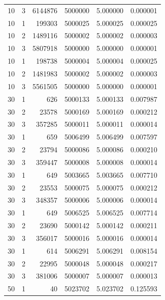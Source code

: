 \documentclass[a4paper,oneside]{book}
\begin{document}
\begin{longtable}[c]{|l|l|r|l|l|l|}
    10       & 3         & 6144876   & 5000000 & 5.000000   & 0.000001 \\
    10       & 1         & 199303    & 5000025 & 5.000025   & 0.000025 \\
    10       & 2         & 1489116   & 5000002 & 5.000002   & 0.000003 \\
    10       & 3         & 5807918   & 5000000 & 5.000000   & 0.000001 \\
    10       & 1         & 198738    & 5000004 & 5.000004   & 0.000025 \\
    10       & 2         & 1481983   & 5000002 & 5.000002   & 0.000003 \\
    10       & 3         & 5561505   & 5000000 & 5.000000   & 0.000001 \\
    30       & 1         & 626       & 5000133 & 5.000133   & 0.007987 \\
    30       & 2         & 23578     & 5000169 & 5.000169   & 0.000212 \\
    30       & 3         & 357285    & 5000011 & 5.000011   & 0.000014 \\
    30       & 1         & 659       & 5006499 & 5.006499   & 0.007597 \\
    30       & 2         & 23794     & 5000086 & 5.000086   & 0.000210 \\
    30       & 3         & 359447    & 5000008 & 5.000008   & 0.000014 \\
    30       & 1         & 649       & 5003665 & 5.003665   & 0.007710 \\
    30       & 2         & 23553     & 5000075 & 5.000075   & 0.000212 \\
    30       & 3         & 348357    & 5000006 & 5.000006   & 0.000014 \\
    30       & 1         & 649       & 5006525 & 5.006525   & 0.007714 \\
    30       & 2         & 23690     & 5000142 & 5.000142   & 0.000211 \\
    30       & 3         & 356017    & 5000016 & 5.000016   & 0.000014 \\
    30       & 1         & 614       & 5006291 & 5.006291   & 0.008154 \\
    30       & 2         & 22995     & 5000048 & 5.000048   & 0.000217 \\
    30       & 3         & 381006    & 5000007 & 5.000007   & 0.000013 \\
    50       & 1         & 40        & 5023702 & 5.023702   & 0.125593 \\

\end{longtable}
\end{document}

